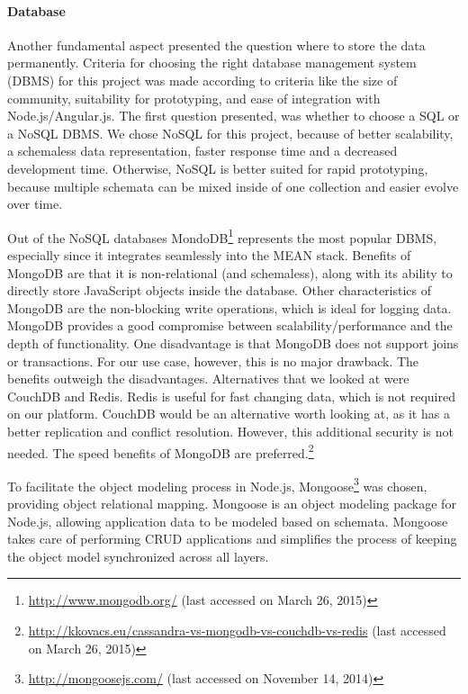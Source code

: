 	\paragraph{Database}

		Another fundamental aspect presented the question where to store the data permanently. Criteria for choosing the right database management system (DBMS) for this project was made according to criteria like the size of community, suitability for prototyping, and ease of integration with Node.js/Angular.js. The first question presented, was whether to choose a SQL or a NoSQL DBMS. We chose NoSQL for this project, because of better scalability, a schemaless data representation, faster response time and a decreased development time\cite{vaish2013getting}. Otherwise, NoSQL is better suited for rapid prototyping, because multiple schemata can be mixed inside of one collection and easier evolve over time. 

		Out of the NoSQL databases MondoDB\footnote{\url{http://www.mongodb.org/} (last accessed on March 26, 2015)} represents the most popular DBMS, especially since it integrates seamlessly into the MEAN stack. Benefits of MongoDB are that it is non-relational (and schemaless), along with its ability to directly store JavaScript objects inside the database. Other characteristics of MongoDB are the non-blocking write operations, which is ideal for logging data. MongoDB provides a good compromise between scalability/performance and the depth of functionality. One disadvantage is that MongoDB does not support joins or transactions. For our use case, however, this is no major drawback. The benefits outweigh the disadvantages. Alternatives that we looked at were CouchDB and Redis. Redis is useful for fast changing data, which is not required on our platform. CouchDB would be an alternative worth looking at, as it has a better replication and conflict resolution. However, this additional security is not needed. The speed benefits of MongoDB are preferred.\footnote{\url{http://kkovacs.eu/cassandra-vs-mongodb-vs-couchdb-vs-redis} (last accessed on March 26, 2015)}
		
		To facilitate the object modeling process in Node.js, Mongoose\footnote{\url{http://mongoosejs.com/} (last accessed on November 14, 2014)} was chosen, providing object relational mapping. Mongoose is an object modeling package for Node.js, allowing application data to be modeled based on schemata. Mongoose takes care of performing CRUD applications and simplifies the process of keeping the object model synchronized across all layers.


